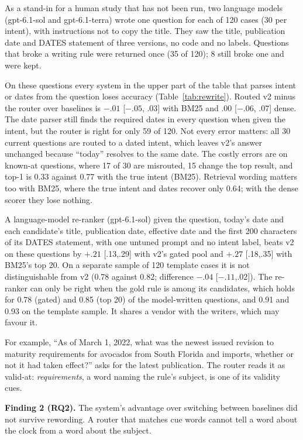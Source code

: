 \documentclass[11pt]{article}
\begin{document}
As a stand-in for a human study that has not been run, two language models (gpt-6.1-sol and gpt-6.1-terra) wrote one question for each of 120 cases (30 per intent), with instructions not to copy the title. They saw the title, publication date and DATES statement of three versions, no code and no labels. Questions that broke a writing rule were returned once (35 of 120); 8 still broke one and were kept.

On these questions every system in the upper part of the table that parses intent or dates from the question loses accuracy (Table~\ref{tab:rewrite}). Routed v2 minus the router over baselines is $-.01$ [$-.05$, $.03$] with BM25 and $.00$ [$-.06$, $.07$] dense. The date parser still finds the required dates in every question when given the intent, but the router is right for only 59 of 120. Not every error matters: all 30 current questions are routed to a dated intent, which leaves v2's answer unchanged because ``today'' resolves to the same date. The costly errors are on known-at questions, where 17 of 30 are misrouted, 15 change the top result, and top-1 is 0.33 against 0.77 with the true intent (BM25). Retrieval wording matters too with BM25, where the true intent and dates recover only 0.64; with the dense scorer they lose nothing.

A language-model re-ranker (gpt-6.1-sol) given the question, today's date and each candidate's title, publication date, effective date and the first 200 characters of its DATES statement, with one untuned prompt and no intent label, beats v2 on these questions by $+.21$ [.13,.29] with v2's gated pool and $+.27$ [.18,.35] with BM25's top 20. On a separate sample of 120 template cases it is not distinguishable from v2 (0.78 against 0.82; difference $-.04$ [$-.11$,$.02$]). The re-ranker can only be right when the gold rule is among its candidates, which holds for 0.78 (gated) and 0.85 (top 20) of the model-written questions, and 0.91 and 0.93 on the template sample. It shares a vendor with the writers, which may favour it.

For example, ``As of March 1, 2022, what was the newest issued revision to maturity requirements for avocados from South Florida and imports, whether or not it had taken effect?'' asks for the latest publication. The router reads it as valid-at: \emph{requirements}, a word naming the rule's subject, is one of its validity cues.

\textbf{Finding 2 (RQ2).} The system's advantage over switching between baselines did not survive rewording. A router that matches cue words cannot tell a word about the clock from a word about the subject.
\end{document}
